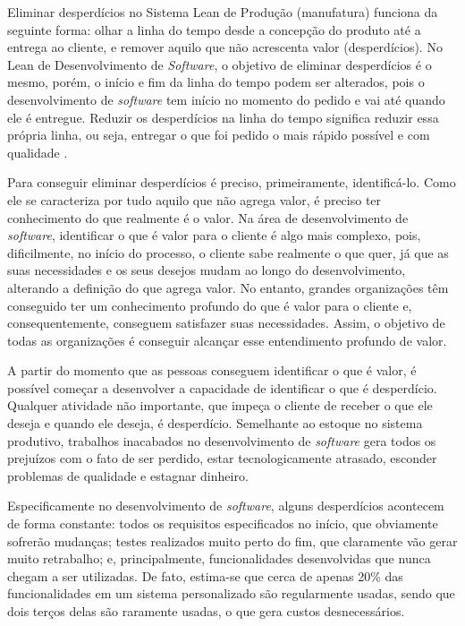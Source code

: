 Eliminar desperdícios no Sistema Lean de Produção (manufatura) funciona da seguinte forma: olhar a linha do tempo desde a concepção do produto até a entrega ao cliente, e remover aquilo que não acrescenta valor (desperdícios). No Lean de Desenvolvimento de \textit{Software}, o objetivo de eliminar desperdícios é o mesmo, porém, o início e fim da linha do tempo podem ser alterados, pois o desenvolvimento de \textit{software} tem início no momento do pedido e vai até quando ele é entregue. Reduzir os desperdícios na linha do tempo significa reduzir essa própria linha, ou seja, entregar o que foi pedido o mais rápido possível e com qualidade  \cite{poppendieck}.

Para conseguir eliminar desperdícios é preciso, primeiramente, identificá-lo. Como ele se caracteriza por tudo aquilo que não agrega valor, é preciso ter conhecimento do que realmente é o valor. Na área de desenvolvimento de \textit{software}, identificar o que é valor para o cliente é algo mais complexo, pois, dificilmente, no início do processo, o cliente sabe realmente o que quer, já que as suas necessidades e os seus desejos mudam ao longo do desenvolvimento, alterando a definição do que agrega valor. No entanto, grandes organizações têm conseguido ter um conhecimento profundo do que é valor para o cliente e, consequentemente, conseguem satisfazer suas necessidades. Assim, o objetivo de todas as organizações é conseguir alcançar esse entendimento profundo de valor.

A partir do momento que as pessoas conseguem identificar o que é valor, é possível começar a desenvolver a capacidade de identificar o que é desperdício. Qualquer atividade não importante, que impeça o cliente de receber o que ele deseja e quando ele deseja, é desperdício. Semelhante ao estoque no sistema produtivo, trabalhos inacabados no desenvolvimento de \textit{software} gera todos os prejuízos com o fato de ser perdido, estar tecnologicamente atrasado, esconder problemas de qualidade e estagnar dinheiro.

Especificamente no desenvolvimento de \textit{software}, alguns desperdícios acontecem de forma constante: todos os requisitos especificados no início, que obviamente sofrerão mudanças; testes realizados muito perto do fim, que claramente vão gerar muito retrabalho; e, principalmente, funcionalidades desenvolvidas que nunca chegam a ser utilizadas.  De fato, estima-se que cerca de apenas 20\% das funcionalidades em um sistema personalizado são regularmente usadas, sendo que dois terços delas são raramente usadas, o que gera custos desnecessários. 

